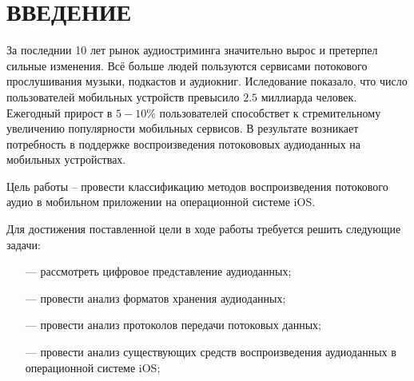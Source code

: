 \section*{ВВЕДЕНИЕ}

\par За последнии 10 лет рынок аудиостриминга значительно вырос и претерпел сильные изменения\cite{robeco}. 
Всё больше людей пользуются сервисами потокового прослушивания музыки, подкастов и аудиокниг.
Иследование \cite{scirp} показало, что число пользователей мобильных устройств превысило $2.5$ миллиарда человек.
Ежегодный прирост в $5-10\%$ пользователей способствет к стремительному увеличению популярности мобильных сервисов.
В результате возникает потребность в поддержке воспроизведения потокововых аудиоданных на мобильных устройствах.
  

\par Цель работы – провести классификацию методов воспроизведения потокового аудио в мобильном приложении на операционной системе iOS.
\par Для достижения поставленной цели в ходе работы требуется решить следующие задачи:

\begin{itemize}
    \item[---] рассмотреть цифровое представление аудиоданных;
    \item[---] провести анализ форматов хранения аудиоданных;
    \item[---] провести анализ протоколов передачи потоковых данных;
    \item[---] провести анализ существующих средств воспроизведения аудиоданных в операционной системе iOS;
\end{itemize} 

